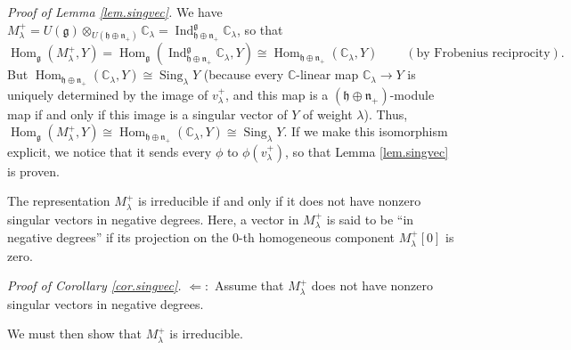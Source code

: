 \documentclass[etingof-lie.tex]{subfiles}
\begin{document}
\textit{Proof of Lemma \ref{lem.singvec}.} We have $M_{\lambda}^{+}=U\left(
\mathfrak{g}\right)  \otimes_{U\left(  \mathfrak{h}\oplus\mathfrak{n}%
_{+}\right)  }\mathbb{C}_{\lambda}=\operatorname*{Ind}\nolimits_{\mathfrak{h}%
\oplus\mathfrak{n}_{+}}^{\mathfrak{g}}\mathbb{C}_{\lambda}$, so that
\[
\operatorname*{Hom}\nolimits_{\mathfrak{g}}\left(  M_{\lambda}^{+},Y\right)
=\operatorname*{Hom}\nolimits_{\mathfrak{g}}\left(  \operatorname*{Ind}%
\nolimits_{\mathfrak{h}\oplus\mathfrak{n}_{+}}^{\mathfrak{g}}\mathbb{C}%
_{\lambda},Y\right)  \cong\operatorname*{Hom}\nolimits_{\mathfrak{h}%
\oplus\mathfrak{n}_{+}}\left(  \mathbb{C}_{\lambda},Y\right)
\ \ \ \ \ \ \ \ \ \ \left(  \text{by Frobenius reciprocity}\right)  .
\]
But $\operatorname*{Hom}\nolimits_{\mathfrak{h}\oplus\mathfrak{n}_{+}}\left(
\mathbb{C}_{\lambda},Y\right)  \cong\operatorname*{Sing}\nolimits_{\lambda}Y$
(because every $\mathbb{C}$-linear map $\mathbb{C}_{\lambda}\rightarrow Y$ is
uniquely determined by the image of $v_{\lambda}^{+}$, and this map is a
$\left(  \mathfrak{h}\oplus\mathfrak{n}_{+}\right)  $-module map if and only
if this image is a singular vector of $Y$ of weight $\lambda$). Thus,
$\operatorname*{Hom}\nolimits_{\mathfrak{g}}\left(  M_{\lambda}^{+},Y\right)
\cong\operatorname*{Hom}\nolimits_{\mathfrak{h}\oplus\mathfrak{n}_{+}}\left(
\mathbb{C}_{\lambda},Y\right)  \cong\operatorname*{Sing}\nolimits_{\lambda}Y$.
If we make this isomorphism explicit, we notice that it sends every $\phi$ to
$\phi\left(  v_{\lambda}^{+}\right)  $, so that Lemma \ref{lem.singvec} is proven.

\begin{corollary}
\label{cor.singvec}The representation $M_{\lambda}^{+}$ is irreducible if and
only if it does not have nonzero singular vectors in negative degrees. Here, a
vector in $M_{\lambda}^{+}$ is said to be ``in negative degrees'' if its
projection on the $0$-th homogeneous component $M_{\lambda}^{+}\left[
0\right]  $ is zero.
\end{corollary}

\textit{Proof of Corollary \ref{cor.singvec}.} $\Longleftarrow:$ Assume that
$M_{\lambda}^{+}$ does not have nonzero singular vectors in negative degrees.

We must then show that $M_{\lambda}^{+}$ is irreducible.
\end{document}
